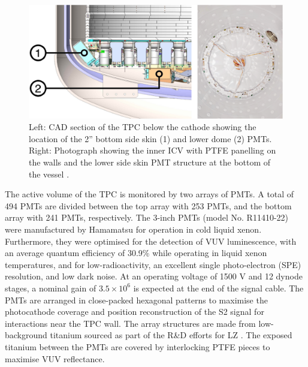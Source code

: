 {\begin{figure}[h!]
        \label{fig:tpc_diagram}
    \end{figure}
    \begin{figure}[h!]
        \centering
        \includegraphics[scale=0.77]{Chapter_2/Figures/Skin_detector.png}
        \caption[CAD diagram (left) showing the TPC below the cathode and a photograph (right), showing the PTFE panelling and the bottom skin PMT array.]%
        {Left: CAD section of the TPC below the cathode showing the location of the 2” bottom side skin (1) and lower dome (2) PMTs. Right: Photograph showing the inner ICV with PTFE panelling on the walls and the lower side skin PMT structure at the bottom of the vessel \cite{Akerib:2019fml}.}
        \label{fig:skin_detector_diagram}
    \end{figure}
}
%

The active volume of the TPC is monitored by two arrays of PMTs. A total of 494 PMTs are divided between the top array with 253 PMTs, and the bottom array with 241 PMTs, respectively. The 3-inch PMTs (model No. R11410-22) were manufactured by Hamamatsu for operation in cold liquid xenon. Furthermore, they were optimised for the detection of VUV luminescence, with an average quantum efficiency of 30.9\% while operating in liquid xenon temperatures, and for low-radioactivity, an excellent single photo-electron (SPE) resolution, and low dark noise. At an operating voltage of 1500 V and 12 dynode stages, a nominal gain of $3.5 \times 10^{6}$ is expected at the end of the signal cable. The PMTs are arranged in close-packed hexagonal patterns to maximise the photocathode coverage and position reconstruction of the S2 signal for interactions near the TPC wall. The array structures are made from low-background titanium sourced as part of the R\&D efforts for LZ \cite{LZ_titanium_selection}. The exposed titanium between the PMTs are covered by interlocking PTFE pieces to maximise VUV reflectance. 

